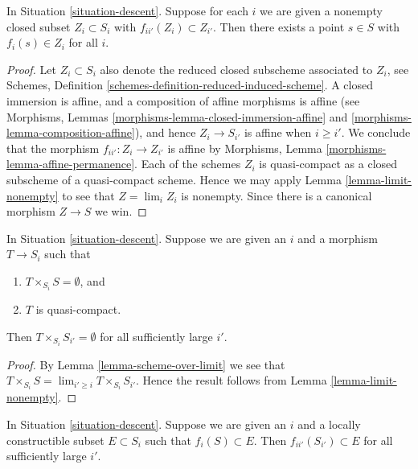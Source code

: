 \begin{lemma}
\label{lemma-limit-closed-nonempty}
In Situation \ref{situation-descent}.
Suppose for each $i$ we are given a nonempty closed subset
$Z_i \subset S_i$ with $f_{ii'}(Z_i) \subset Z_{i'}$.
Then there exists a point $s \in S$ with $f_i(s) \in Z_i$ for
all $i$.
\end{lemma}

\begin{proof}
Let $Z_i \subset S_i$ also denote the reduced closed subscheme
associated to $Z_i$, see Schemes,
Definition \ref{schemes-definition-reduced-induced-scheme}.
A closed immersion is affine, and a composition of affine
morphisms is affine (see
Morphisms, Lemmas \ref{morphisms-lemma-closed-immersion-affine}
and \ref{morphisms-lemma-composition-affine}), and hence $Z_i \to S_{i'}$ is
affine when $i \geq i'$. We conclude that the morphism
$f_{ii'} : Z_i \to Z_{i'}$ is affine by
Morphisms, Lemma \ref{morphisms-lemma-affine-permanence}.
Each of the schemes $Z_i$ is quasi-compact as a closed
subscheme of a quasi-compact scheme. Hence we may apply
Lemma \ref{lemma-limit-nonempty} to see that
$Z = \lim_i Z_i$ is nonempty. Since there is a
canonical morphism $Z \to S$ we win.
\end{proof}

\begin{lemma}
\label{lemma-limit-fibre-product-empty}
In Situation \ref{situation-descent}.
Suppose we are given an $i$ and a morphism $T \to S_i$ such that
\begin{enumerate}
\item $T \times_{S_i} S = \emptyset$, and
\item $T$ is quasi-compact.
\end{enumerate}
Then $T \times_{S_i} S_{i'} = \emptyset$ for all sufficiently large $i'$.
\end{lemma}

\begin{proof}
By Lemma \ref{lemma-scheme-over-limit}
we see that $T \times_{S_i} S = \lim_{i' \geq i} T \times_{S_i} S_{i'}$.
Hence the result follows from
Lemma \ref{lemma-limit-nonempty}.
\end{proof}

\begin{lemma}
\label{lemma-limit-contained-in-constructible}
In Situation \ref{situation-descent}.
Suppose we are given an $i$ and a locally constructible subset
$E \subset S_i$ such that $f_i(S) \subset E$.
Then $f_{ii'}(S_{i'}) \subset E$ for all sufficiently large $i'$.
\end{lemma}

